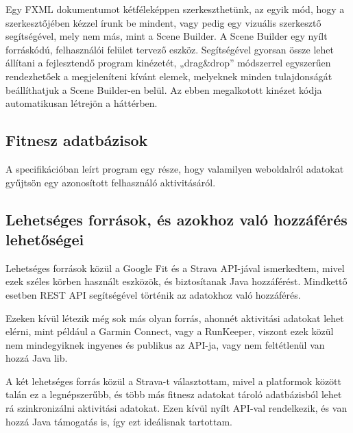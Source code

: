 Egy FXML dokumentumot kétféleképpen szerkeszthetünk, az egyik mód, hogy a szerkesztőjében kézzel írunk be mindent, vagy pedig egy vizuális szerkesztő segítségével, mely nem más, mint a Scene Builder.
A Scene Builder egy nyílt forráskódú, felhasználói felület tervező eszköz.
Segítségével gyorsan össze lehet állítani a fejlesztendő program kinézetét, „drag\&drop” módszerrel egyszerűen rendezhetőek a megjeleníteni kívánt elemek, melyeknek minden tulajdonságát beállíthatjuk a Scene Builder-en belül.
Az ebben megalkotott kinézet kódja automatikusan létrejön a háttérben.

\subsection{Fitnesz adatbázisok}

A specifikációban leírt program egy része, hogy valamilyen weboldalról adatokat gyűjtsön egy azonosított felhasználó aktivitásáról. 

\subsection*{Lehetséges források, és azokhoz való hozzáférés lehetőségei}

Lehetséges források közül a Google Fit és a Strava API-jával ismerkedtem, mivel ezek széles körben használt eszközök, és biztosítanak Java hozzáférést.
Mindkettő esetben REST API segítségével történik az adatokhoz való hozzáférés.

Ezeken kívül létezik még sok más olyan forrás, ahonnét aktivitási adatokat lehet elérni, mint például a Garmin Connect, vagy a RunKeeper, viszont ezek közül nem mindegyiknek ingyenes és publikus az API-ja, vagy nem feltétlenül van hozzá Java lib. 

A két lehetséges forrás közül a Strava-t választottam, mivel a platformok között talán ez a legnépszerűbb, és több más fitnesz adatokat tároló adatbázisból lehet rá szinkronizálni aktivitási adatokat.
Ezen kívül nyílt API-val rendelkezik, és van hozzá Java támogatás is, így ezt ideálisnak tartottam. 